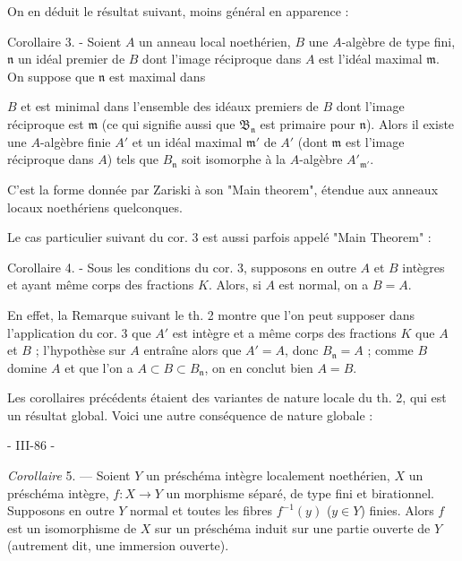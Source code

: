 On en déduit le résultat suivant, moins général en apparence :

Corollaire 3. - Soient $A$ un anneau local noethérien, $B$ une $A$-algèbre de type fini, $\mathfrak{n}$ un idéal premier de $B$ dont l'image réciproque dans $A$ est l'idéal maximal $\mathfrak{m}$. On suppose que $\mathfrak{n}$ est maximal dans

\newpage



$B$ et est minimal dans l'ensemble des idéaux premiers de $B$ dont l'image réciproque est $\mathfrak{m}$ (ce qui signifie aussi que $\mathfrak{B}_{\mathfrak{n}}$ est primaire pour $\mathfrak{n}$). Alors il existe une $A$-algèbre finie $A'$ et un idéal maximal $\mathfrak{m}'$ de $A'$ (dont $\mathfrak{m}$ est l'image réciproque dans $A$) tels que $B_{\mathfrak{n}}$ soit isomorphe à la $A$-algèbre $A'_{\mathfrak{m}'}$.

C'est la forme donnée par Zariski à son "Main theorem", étendue aux anneaux locaux noethériens quelconques.

Le cas particulier suivant du cor. 3 est aussi parfois appelé "Main Theorem" :

Corollaire 4. - Sous les conditions du cor. 3, supposons en outre $A$ et $B$ intègres et ayant même corps des fractions $K$. Alors, si $A$ est normal, on a $B=A$.

En effet, la Remarque suivant le th. 2 montre que l'on peut supposer dans l'application du cor. 3 que $A'$ est intègre et a même corps des fractions $K$ que $A$ et $B$ ; l'hypothèse sur $A$ entraîne alors que $A'=A$, donc $B_{\mathfrak{n}}=A$ ; comme $B$ domine $A$ et que l'on a $A \subset B \subset B_{\mathfrak{n}}$, on en conclut bien $A=B$.

Les corollaires précédents étaient des variantes de nature locale du th. 2, qui est un résultat global. Voici une autre conséquence de nature globale :

\newpage


- III-86 -

\emph{Corollaire} 5. — Soient $Y$ un préschéma intègre localement noethérien, $X$ un préschéma intègre, $f : X \to Y$ un morphisme séparé, de type fini et birationnel. Supposons en outre $Y$ normal et toutes les fibres $f^{-1}(y)$ ($y \in Y$) finies. Alors $f$ est un isomorphisme de $X$ sur un préschéma induit sur une partie ouverte de $Y$ (autrement dit, une immersion ouverte).


